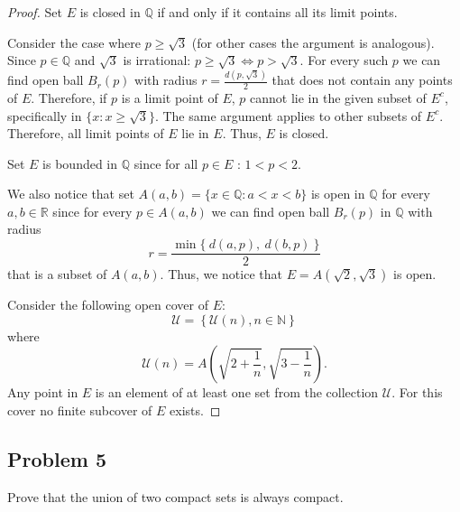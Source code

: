 \documentclass{article}
\begin{document}
\begin{proof}

Set $E$ is closed in $\mathbb{Q}$ if and only if it contains all its limit points. 

Consider the case where $p \geq \sqrt{3}$ (for other cases the argument is analogous). Since $p \in \mathbb{Q}$ and $\sqrt{3}$ is irrational: $p \geq \sqrt{3} \iff p > \sqrt{3}$. For every such $p$ we can find open ball $B_r(p)$ with radius $r = \frac{d(p,\sqrt{3})}{2}$ that does not contain any points of $E$. Therefore, if $p$ is a limit point of $E$, $p$ cannot lie in the given subset of $E^c$, specifically in $\{x : x \geq \sqrt{3} \}$. The same argument applies to other subsets of $E^c$. Therefore, all limit points of $E$ lie in $E$. Thus, $E$ is closed.

Set $E$ is bounded in $\mathbb{Q}$ since for all $p \in E$ : $1 < p < 2$.

We also notice that set $A(a,b) = \{x \in \mathbb{Q} : a < x < b \}$ is open in $\mathbb{Q}$ for every $a,b \in \mathbb{R}$ since for every $p \in A(a,b)$ we can find open ball $B_r(p)$ in $\mathbb{Q}$ with radius
$$ r = \frac{\min\{ \> d(a, p), \> d(b, p) \> \}}{2} $$
that is a subset of $A(a,b)$. Thus, we notice that $E = A(\sqrt{2}, \sqrt{3})$ is open.

Consider the following open cover of $E$:
$$ \mathcal{U} = \left\{ \mathcal{U}(n) , n \in \mathbb{N} \right\} $$
where
$$ \mathcal{U}(n) = A \left( \sqrt{2+\frac{1}{n}}, \sqrt{3 - \frac{1}{n}} \right). $$
Any point in $E$ is an element of at least one set from the collection $\mathcal{U}$. For this cover no finite subcover of $E$ exists.

\end{proof}


\subsection*{Problem 5}

\begin{tcolorbox}
Prove that the union of two compact sets is always compact. 
\end{tcolorbox}
\end{document}
